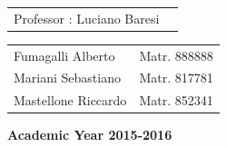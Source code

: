 \documentclass[15pt,a4paper,oneside]{article}
\begin{document}
\begin{center}
\begin{flushleft}
\begin{tabular}{l l }

\end{tabular}
\end{flushleft}
\vspace{5mm}

\begin{flushleft}
\begin{tabular}{l l }
Professor : Luciano Baresi\\
\end{tabular}
\end{flushleft}

\begin{flushright}
\begin{tabular}{l l }
Fumagalli Alberto & Matr. 888888\\
Mariani Sebastiano & Matr. 817781\\
Mastellone Riccardo & Matr. 852341\\
\end{tabular}
\end{flushright}

\vspace{43mm}
{\large{\bf Academic Year 2015-2016}}
\end{center}

\newpage
\tableofcontents
\listoffigures
\newpage





\newpage

\newpage

\newpage

\newpage

\newpage


%

%

%
\end{document}
